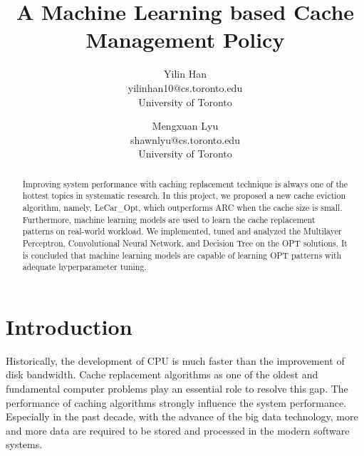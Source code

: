 \documentclass[letterpaper,twocolumn,10pt]{article}
\begin{document}

\date{}

\title{\Large \bf A Machine Learning based Cache Management Policy}

\author{
{\rm Yilin Han}\\
yilinhan10@cs.toronto.edu\\
University of Toronto
\and
{\rm Mengxuan Lyu}\\
shawnlyu@cs.toronto.edu\\
University of Toronto
} %

\maketitle

\begin{abstract}
Improving system performance with caching replacement technique is always one of the hottest topics in systematic research. In this project, we proposed a new cache eviction algorithm, namely, LeCar\_Opt, which outperforms ARC when the cache size is small. Furthermore, machine learning models are used to learn the cache replacement patterns on real-world workload. We implemented, tuned and analyzed the Multilayer Perceptron, Convolutional Neural Network, and Decision Tree on the OPT solutions. It is concluded that machine learning models are capable of learning OPT patterns with adequate hyperparameter tuning.


\end{abstract}


\section{Introduction}
Historically, the development of CPU is much faster than the improvement of disk bandwidth. Cache replacement algorithms as one of the oldest and fundamental computer problems play an essential role to resolve this gap. The performance of caching algorithms strongly influence the system performance. Especially in the past decade,  with the advance of the big data technology, more and more data are required to be stored and processed in the modern software systems. 
\end{document}
